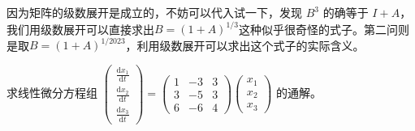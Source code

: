 \begin{remark}
因为矩阵的级数展开是成立的，不妨可以代入试一下，发现 \(B^3\) 的确等于 \(I+A\)，我们用级数展开可以直接求出$B=(1+A)^{1/3} $这种似乎很奇怪的式子。第二问则是取$B=(1+A)^{1/2023} $，利用级数展开可以求出这个式子的实际含义。
\end{remark}


\begin{example}
求线性微分方程组
$
\begin{pmatrix}
\frac{\mathrm{d}x_1}{\mathrm{d} t} \\\frac{\mathrm{d}x_2}{\mathrm{d} t} \\\frac{\mathrm{d}x_3}{\mathrm{d} t}
\end{pmatrix}=
\begin{pmatrix}
1&-3&3\\
3&-5&3\\
6&-6&4
\end{pmatrix} 
\begin{pmatrix}
x_1\\x_2\\x_3
\end{pmatrix}
$               的通解。
\end{example}


